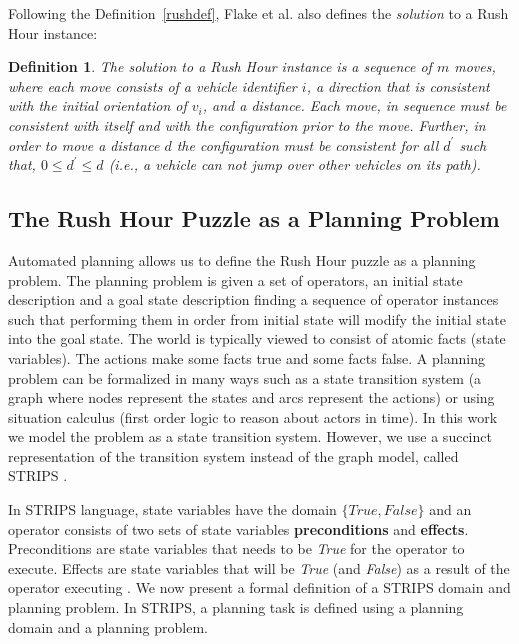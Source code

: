 \documentclass[doctor]{thesis} %
\newcommand{\dref}[1]{Definition~\ref{#1}} %
\theoremstyle{plain}
\newtheorem{definition}{Definition}
\begin{document}
Following the \dref{rushdef}, Flake et al. also defines the \textit{solution} to a Rush Hour instance:
\begin{definition} 
The solution to a Rush Hour instance is a sequence of $m$ moves, where each move consists of a vehicle identifier $i$, a direction that is consistent with the initial orientation of $v_i$, and a distance. Each move, in sequence must be consistent with itself and with the configuration prior to the move. Further, in order to move a distance $d$ the configuration must be consistent for all $d^\prime$ such that, $0\leqslant d^\prime \leqslant d$ (i.e., a vehicle can not jump over other vehicles on its path).
\end{definition}

\subsection*{The Rush Hour Puzzle as a Planning Problem}
\label{sec:rushhourasaplanningproblem}
Automated planning allows us to define the Rush Hour puzzle as a planning problem. The planning problem is given a set of operators, an initial state description and a goal state description finding a sequence of operator instances such that performing them in order from initial state will modify the initial state into the goal state. The world is typically viewed to consist of atomic facts (state variables). The actions make some facts true and some facts false. A planning problem can be formalized in many ways such as a state transition system (a graph where nodes represent the states and arcs represent the actions) or using situation calculus (first order logic to reason about actors in time). In this work we model the problem as a state transition system. However, we use a succinct representation of the transition system instead of the graph model, called STRIPS \cite{fikes1971strips}.

In STRIPS language, state variables have the domain $\lbrace True, False \rbrace$ and an operator consists of two sets of state variables \textbf{preconditions} and \textbf{effects}. Preconditions are state variables that needs to be \textit{True} for the operator to execute. Effects are state variables that will be \textit{True} (and \textit{False}) as a result of the operator executing . We now present a formal definition of a STRIPS domain and planning problem. In STRIPS, a planning task is defined using a planning domain and a planning problem.
\end{document}
